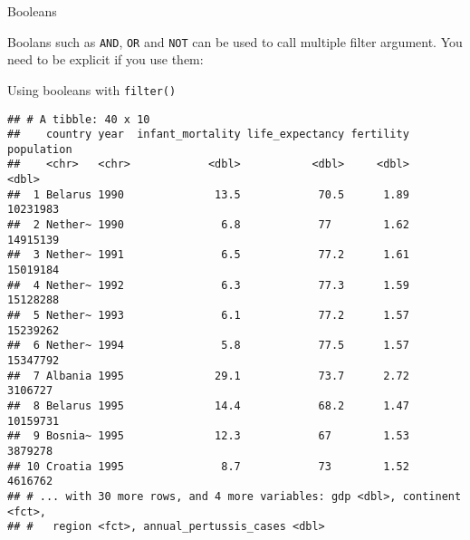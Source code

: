\documentclass[ignorenonframetext,]{beamer}
\newenvironment{Shaded}{\begin{snugshade}}{\end{snugshade}}
\newcommand{\CommentTok}[1]{\textcolor[rgb]{0.56,0.35,0.01}{\textit{#1}}}
\newcommand{\DecValTok}[1]{\textcolor[rgb]{0.00,0.00,0.81}{#1}}
\newcommand{\KeywordTok}[1]{\textcolor[rgb]{0.13,0.29,0.53}{\textbf{#1}}}
\newcommand{\NormalTok}[1]{#1}
\newcommand{\OperatorTok}[1]{\textcolor[rgb]{0.81,0.36,0.00}{\textbf{#1}}}
\newcommand{\StringTok}[1]{\textcolor[rgb]{0.31,0.60,0.02}{#1}}
\begin{document}
\begin{frame}[fragile]{Booleans}
\protect\hypertarget{booleans}{}

Boolans such as \texttt{AND}, \texttt{OR} and \texttt{NOT} can be used
to call multiple filter argument. You need to be explicit if you use
them:

\begin{block}{Using booleans with \texttt{filter()}}

\begin{Shaded}
\end{Shaded}

\begin{verbatim}
## # A tibble: 40 x 10
##    country year  infant_mortality life_expectancy fertility population
##    <chr>   <chr>            <dbl>           <dbl>     <dbl>      <dbl>
##  1 Belarus 1990              13.5            70.5      1.89   10231983
##  2 Nether~ 1990               6.8            77        1.62   14915139
##  3 Nether~ 1991               6.5            77.2      1.61   15019184
##  4 Nether~ 1992               6.3            77.3      1.59   15128288
##  5 Nether~ 1993               6.1            77.2      1.57   15239262
##  6 Nether~ 1994               5.8            77.5      1.57   15347792
##  7 Albania 1995              29.1            73.7      2.72    3106727
##  8 Belarus 1995              14.4            68.2      1.47   10159731
##  9 Bosnia~ 1995              12.3            67        1.53    3879278
## 10 Croatia 1995               8.7            73        1.52    4616762
## # ... with 30 more rows, and 4 more variables: gdp <dbl>, continent <fct>,
## #   region <fct>, annual_pertussis_cases <dbl>
\end{verbatim}


\end{block}
\end{frame}
\end{document}
